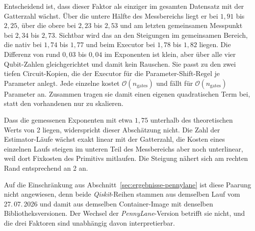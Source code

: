 Entscheidend ist, dass dieser Faktor als einziger im gesamten Datensatz mit der
Gatterzahl wächst. Über die untere Hälfte des Messbereichs liegt er bei $1{,}91$
bis $2{,}25$, über die obere bei $2{,}23$ bis $2{,}53$ und am letzten
gemeinsamen Messpunkt bei $2{,}34$ bis $2{,}73$. Sichtbar wird das an den
Steigungen im gemeinsamen Bereich, die nativ bei $1{,}74$ bis $1{,}77$ und beim
Executor bei $1{,}78$ bis $1{,}82$ liegen. Die Differenz von rund $0{,}03$ bis
$0{,}04$ im Exponenten ist klein, aber über alle vier Qubit-Zahlen
gleichgerichtet und damit kein Rauschen. Sie passt zu den zwei tiefen
Circuit-Kopien, die der Executor für die Parameter-Shift-Regel je Parameter
anlegt. Jede einzelne kostet $\mathcal{O}(n_{\mathrm{gates}})$ und fällt für
$\mathcal{O}(n_{\mathrm{gates}})$ Parameter an. Zusammen tragen sie damit einen
eigenen quadratischen Term bei, statt den vorhandenen nur zu skalieren.

Dass die gemessenen Exponenten mit etwa $1{,}75$ unterhalb des theoretischen
Werts von 2 liegen, widerspricht dieser Abschätzung nicht. Die Zahl der
Estimator-Läufe wächst exakt linear mit der Gatterzahl, die Kosten eines
einzelnen Laufs steigen im unteren Teil des Messbereichs aber noch unterlinear,
weil dort Fixkosten des Primitivs mitlaufen. Die Steigung nähert sich am rechten
Rand entsprechend an 2 an.

Auf die Einschränkung aus Abschnitt~\ref{sec:ergebnisse-pennylane} ist diese
Paarung nicht angewiesen, denn beide \textit{Qiskit}-Reihen stammen aus
demselben Lauf vom 27.\,07.\,2026 und damit aus demselben Container-Image mit
denselben Bibliotheksversionen. Der Wechsel der \textit{PennyLane}-Version
betrifft sie nicht, und die drei Faktoren sind unabhängig davon interpretierbar.

